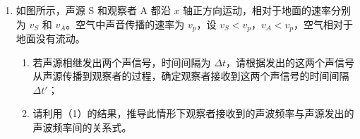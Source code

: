 \documentclass[\gkver]{gaokaozhenti}
\begin{document}
\begin{enumerate}
{\begin{enumerate}
	\item
	系统处于平衡状态时，两小环的可能位置为：
	\begin{itemize}
		\item
		a．两小环同时位于大圆环的底端；
		\item
		b．两小环同时位于大圆环的顶端；
		\item
		c．两小环一个位于大圆环的顶端，另一个位于大圆环的底端；
		\item
		d．除上述三种情况外，由对称性可知，系统如能平衡，则两小圆环的位置一定关于大圆环竖直对称轴对称。设平衡时，两小圆环在大圆环竖直对称轴两侧 $\alpha$ 角的位置上（如图所示）。


		对于重物 $m$，受绳子拉力 $T$ 与重力 $mg$ 的作用，有 $T=mg$。
		对于小圆环，受到三个力的作用，水平绳子的拉力 $T$、竖直绳子的拉力 $T$、大圆环的支持力 $N$。两绳子的拉力沿大圆环切向的分力大小相等，方向相反，有 $T\sin\alpha=T\sin\alpha'$，解得 $\alpha=\alpha'$，又 $\alpha+\alpha'=90^\circ$，故 $\alpha=45^\circ$。
	\end{itemize}
\end{enumerate}
}

\item
如图所示，声源 S 和观察者 A 都沿 $x$ 轴正方向运动，相对于地面的速率分别为 $v_{S}$ 和 $v_{A}$。空气中声音传播的速率为 $v_{p}$，设 $v_{S}<v_{p}$，$v_{A}<v_{p}$，空气相对于地面没有流动。
\begin{enumerate}
	\item
	若声源相继发出两个声信号，时间间隔为 $\Delta t$，请根据发出的这两个声信号从声源传播到观察者的过程，确定观察者接收到这两个声信号的时间间隔 $\Delta t'$；

	\item
	请利用（1）的结果，推导此情形下观察者接收到的声波频率与声源发出的声波频率间的关系式。
\end{enumerate}
\onepicture[align=right, w=6.49cm]{}

\end{enumerate}
\end{document}
